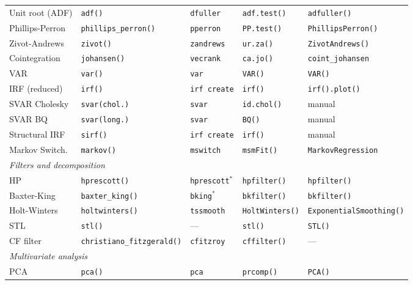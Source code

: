 {\begin{longtable}{lllll}
Unit root (ADF) & \texttt{adf()}        & \texttt{dfuller}      & \texttt{adf.test()}    & \texttt{adfuller()} \\
Phillips-Perron & \texttt{phillips\_perron()} & \texttt{pperron} & \texttt{PP.test()}   & \texttt{PhillipsPerron()} \\
Zivot-Andrews   & \texttt{zivot()}      & \texttt{zandrews}     & \texttt{ur.za()}       & \texttt{ZivotAndrews()} \\
Cointegration   & \texttt{johansen()}   & \texttt{vecrank}      & \texttt{ca.jo()}       & \texttt{coint\_johansen} \\
VAR             & \texttt{var()}        & \texttt{var}          & \texttt{VAR()}         & \texttt{VAR()} \\
IRF (reduced)   & \texttt{irf()}        & \texttt{irf create}   & \texttt{irf()}         & \texttt{irf().plot()} \\
SVAR Cholesky   & \texttt{svar(chol.)}  & \texttt{svar}         & \texttt{id.chol()}     & manual \\
SVAR BQ         & \texttt{svar(long.)}  & \texttt{svar}         & \texttt{BQ()}          & manual \\
Structural IRF  & \texttt{sirf()}       & \texttt{irf create}   & \texttt{irf()}         & manual \\
Markov Switch.  & \texttt{markov()}     & \texttt{mswitch}      & \texttt{msmFit()}      & \texttt{MarkovRegression} \\
\midrule
\multicolumn{5}{l}{\textit{Filters and decomposition}} \\
HP              & \texttt{hprescott()}  & \texttt{hprescott}$^*$ & \texttt{hpfilter()}  & \texttt{hpfilter()} \\
Baxter-King     & \texttt{baxter\_king()} & \texttt{bking}$^*$  & \texttt{bkfilter()}   & \texttt{bkfilter()} \\
Holt-Winters    & \texttt{holtwinters()} & \texttt{tssmooth}   & \texttt{HoltWinters()} & \texttt{ExponentialSmoothing()} \\
STL             & \texttt{stl()}        & —                     & \texttt{stl()}         & \texttt{STL()} \\
CF filter       & \texttt{christiano\_fitzgerald()} & \texttt{cfitzroy} & \texttt{cffilter()} & — \\
\midrule
\multicolumn{5}{l}{\textit{Multivariate analysis}} \\
PCA             & \texttt{pca()}        & \texttt{pca}          & \texttt{prcomp()}      & \texttt{PCA()} \\

\end{longtable}}
